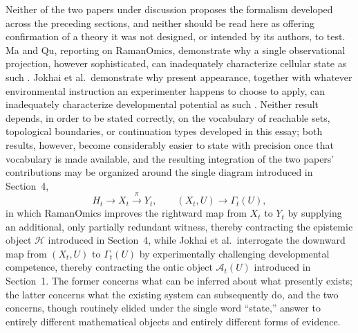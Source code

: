 \documentclass[11pt]{article}
\begin{document}
Neither of the two papers under discussion proposes the formalism developed across the preceding sections, and neither should be read here as offering confirmation of a theory it was not designed, or intended by its authors, to test. Ma and Qu, reporting on RamanOmics, demonstrate why a single observational projection, however sophisticated, can inadequately characterize cellular state as such \cite{maqu2026}. Jokhai et al.\ demonstrate why present appearance, together with whatever environmental instruction an experimenter happens to choose to apply, can inadequately characterize developmental potential as such \cite{jokhai2026}. Neither result depends, in order to be stated correctly, on the vocabulary of reachable sets, topological boundaries, or continuation types developed in this essay; both results, however, become considerably easier to state with precision once that vocabulary is made available, and the resulting integration of the two papers' contributions may be organized around the single diagram introduced in Section~4,
\begin{equation}
H_t \longrightarrow X_t \xrightarrow{\ \pi\ } Y_t, \qquad (X_t, U) \longrightarrow \Gamma_t(U),
\end{equation}
in which RamanOmics improves the rightward map from $X_t$ to $Y_t$ by supplying an additional, only partially redundant witness, thereby contracting the epistemic object $\mathcal{H}$ introduced in Section~4, while Jokhai et al.\ interrogate the downward map from $(X_t, U)$ to $\Gamma_t(U)$ by experimentally challenging developmental competence, thereby contracting the ontic object $\mathcal{A}_t(U)$ introduced in Section~1. The former concerns what can be inferred about what presently exists; the latter concerns what the existing system can subsequently do, and the two concerns, though routinely elided under the single word ``state,'' answer to entirely different mathematical objects and entirely different forms of evidence.
\end{document}
